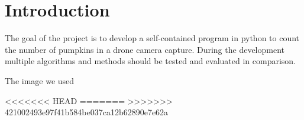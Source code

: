 \documentclass[../Head/Main.tex]{subfiles}
\begin{document}
\section{Introduction}

The goal of the project is to develop a self-contained program in python to count the number of pumpkins in a drone camera capture.
During the development multiple algorithms and methods should be tested and evaluated in comparison.

The image we used

<<<<<<< HEAD
=======
>>>>>>> 421002493e97f41b584be037ca12b62890e7e62a
\end{document}
